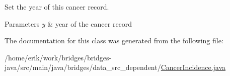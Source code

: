 Set the year of this cancer record. 


\begin{DoxyParams}{Parameters}
{\em y} & year of the cancer record \\
\hline
\end{DoxyParams}


The documentation for this class was generated from the following file\+:\begin{DoxyCompactItemize}
\item 
/home/erik/work/bridges/bridges-\/java/src/main/java/bridges/data\+\_\+src\+\_\+dependent/\hyperlink{_cancer_incidence_8java}{Cancer\+Incidence.\+java}\end{DoxyCompactItemize}
